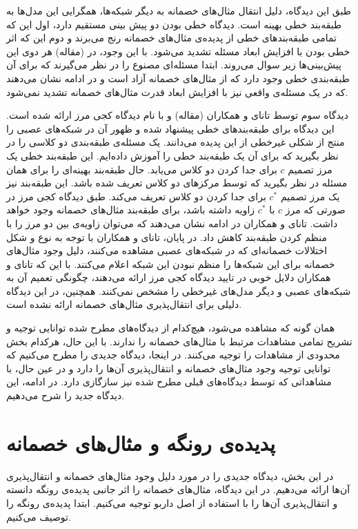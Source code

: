 \documentclass[12pt,onecolumn,a4paper]{article}
\begin{document}
طبق این دیدگاه، دلیل انتقال مثال‌های خصمانه به دیگر شبکه‌ها، همگرایی این مدل‌ها به طبقه‌بند خطی بهینه است. دیدگاه خطی بودن دو پیش بینی مستقیم دارد، اول این که تمامی طبقه‌بندهای خطی از پدیده‌ی مثال‌های خصمانه رنج می‌برند و دوم این که اثر خطی بودن با افزایش ابعاد مسئله تشدید می‌شود. با این وجود، در
(مقاله)
هر دوی این پیش‌بینی‌ها زیر سوال می‌روند. ابتدا مسئله‌ای  مصنوع را در نظر می‌گیرند که برای آن طبقه‌بندی خطی وجود دارد که از مثال‌های خصمانه آزاد است و در ادامه نشان می‌دهند که در یک مسئله‌ی واقعی نیز با افزایش ابعاد قدرت مثال‌های خصمانه تشدید نمی‌شود.

دیدگاه سوم توسط تانای و همکاران
(مقاله)
 و با نام دیدگاه کجی مرز ارائه شده است. این دیدگاه برای طبقه‌بندهای خطی پیشنهاد شده و ظهور آن در شبکه‌های عصبی را منتج از شکلی غیرخطی از این پدیده می‌دانند. یک مسئله‌ی طبقه‌بندی دو کلاسی را در نظر بگیرید که برای آن یک طبقه‌بند خطی را آموزش داده‌ایم. این طبقه‌بند خطی یک مرز تصمیم
 $c$
 برای جدا کردن دو کلاس می‌یابد. حال طبقه‌بند بهینه‌ای را برای همان مسئله در نظر بگیرید که توسط مرکزهای دو کلاس تعریف شده باشد. این طبقه‌بند نیز یک مرز تصمیم
 $c^*$
 برای جدا کردن دو کلاس تعریف می‌کند. طبق دیدگاه کجی مرز در صورتی که مرز
 $c$
 با
 $c^*$
 زاویه داشته باشد، برای طبقه‌بند مثال‌های خصمانه وجود خواهد داشت. تانای و همکاران در ادامه نشان می‌دهند که می‌توان زاویه‌ی بین دو مرز را با منظم کردن
طبقه‌بند کاهش داد. در پایان، تانای و همکاران با توجه به نوع و شکل اختلالات خصمانه‌ای که در شبکه‌های عصبی مشاهده می‌کنند، دلیل وجود مثال‌های خصمانه برای این شبکه‌ها را منظم نبودن این شبکه اعلام می‌کنند. با این که تانای و همکاران دلایل خوبی در تایید دیدگاه کجی مرز ارائه می‌دهند، چگونگی تعمیم آن به شبکه‌های عصبی و دیگر مدل‌های غیرخطی را مشخص نمی‌کنند. همچنین، در این دیدگاه دلیلی برای انتقال‌پذیری مثال‌های خصمانه ارائه نشده است.

همان گونه که مشاهده می‌شود، هیچ‌کدام از دیدگاه‌های مطرح شده توانایی توجیه و تشریح تمامی مشاهدات مرتبط با مثال‌های خصمانه را ندارند. با این حال، هرکدام بخش محدودی از مشاهدات را توجیه می‌کنند. در اینجا، دیدگاه جدیدی را مطرح می‌کنیم که توانایی توجیه وجود مثال‌های خصمانه و انتقال‌پذیری آن‌ها را دارد و  در عین حال، با مشاهداتی که توسط دیدگاه‌های قبلی مطرح شده نیز سازگازی دارد. در ادامه، این دیدگاه جدید را شرح می‌دهیم.

\section{پدیده‌ی رونگه و مثال‌های خصمانه}
در این بخش، دیدگاه جدیدی را در مورد دلیل وجود مثال‌های خصمانه و انتقال‌پذیری آن‌ها ارائه می‌دهیم. در این دیدگاه، مثال‌های خصمانه را اثر جانبی پدیده‌ی رونگه دانسته و انتقال‌پذیری آن‌ها را با استفاده از اصل داربو توجیه می‌کنیم. ابتدا پدیده‌ی رونگه را توصیف می‌کنیم.
\end{document}
